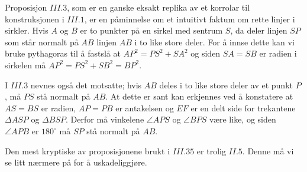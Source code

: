 \documentclass[norsk,twoside,utf8]{article}
\begin{document}
\begin{multicols}{2}
\begin{center}
\end{center}
\vspace{1cm}
\noindent
Proposisjon $III.3$, som er en ganske eksakt replika av et korrolar til konstruksjonen i $III.1$, er en påminnelse om et intuitivt faktum om rette linjer i sirkler. Hvis $A$ og $B$ er to punkter på en sirkel med sentrum $S$, da deler linjen $SP$ som står normalt på $AB$ linjen $AB$ i to like store deler. For å innse dette kan vi bruke pythagoras til å fastslå at $AP^2 = PS^2 + SA^2$ og siden $SA=SB$ er radien i sirkelen må $AP^2=PS^2+SB^2 = BP^2$. 

I $III.3$ nevnes også det motsatte; hvis $AB$ deles i to like store deler av et punkt $P$, må $PS$ stå normalt på $AB$. At dette er sant kan erkjennes ved å konstatere at $AS=BS$ er radien, $AP=PB$ er antakelsen og $EF$ er en delt side for trekantene $\Delta ASP$ og $\Delta BSP$. Derfor må vinkelene $\angle APS$ og $\angle BPS$ være like, og siden $\angle APB$ er $180^\circ$ må $SP$ stå normalt på $AB$.
\end{multicols}
Den mest kryptiske av proposisjonene brukt i $III.35$ er trolig $II.5$. Denne må vi se litt nærmere på for å uskadeliggjøre. 
\end{document}
